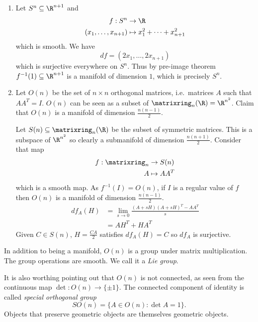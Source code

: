 \documentclass[a4paper]{article}
\begin{document}
\begin{eg}\leavevmode
  \begin{enumerate}
  \item Let \(S^n \subseteq \R^{n + 1}\) and
  \begin{align*}
    f: S^n &\to \R \\
    (x_1, \dots, x_{n + 1}) &\mapsto x_1^2 + \dots + x_{n + 1}^2
  \end{align*}
  which is smooth. We have
  \[
    df = (2x_1, \dots, 2x_{n + 1})
  \]
  which is surjective everywhere on \(S^n\). Thus by pre-image theorem \(f^{-1}(1) \subseteq \R^{n + 1}\) is a manifold of dimension \(1\), which is precisely \(S^n\).
\item Let \(O(n)\) be the set of \(n \times n\) orthogonal matrices, i.e.\ matrices \(A\) such that \(AA^T = I\). \(O(n)\) can be seen as a subset of \(\matrixring_n(\R) = \R^{n^2}\). Claim that \(O(n)\) is a manifold of dimension \(\frac{n(n - 1)}{2}\).

  Let \(S(n) \subseteq \matrixring_n(\R)\) be the subset of symmetric matrices. This is a subspace of \(\R^{n^2}\) so clearly a submanifold of dimension \(\frac{n(n + 1)}{2}\). Consider that map
  \begin{align*}
    f: \matrixring_n &\to S(n) \\
    A &\mapsto AA^T
  \end{align*}
  which is a smooth map. As \(f^{-1}(I) = O(n)\), if \(I\) is a regular value of \(f\) then \(O(n)\) is a manifold of dimension \(\frac{n(n - 1)}{2}\).
  \begin{align*}
    df_A(H) &= \lim_{s \to 0} \frac{(A + sH)(A + sH)^T - AA^T}{s} \\
            &= AH^T + HA^T
  \end{align*}
  Given \(C \in S(n)\), \(H = \frac{CA}{2}\) satisfies \(df_A(H) = C\) so \(df_A\) is surjective.
  \end{enumerate}
\end{eg}

\begin{remark}
  In addition to being a manifold, \(O(n)\) is a group under matrix multiplication. The group operations are smooth. We call it a \emph{Lie group}.

  It is also worthing pointing out that \(O(n)\) is not connected, as seen from the continuous map \(\det: O(n) \to \{\pm 1\}\). The connected component of identity is called \emph{special orthogonal group}
  \[
    SO(n) = \{A \in O(n): \det A = 1\}.
  \]
  Objects that preserve geometric objects are themselves geometric objects.
\end{remark}
\end{document}
